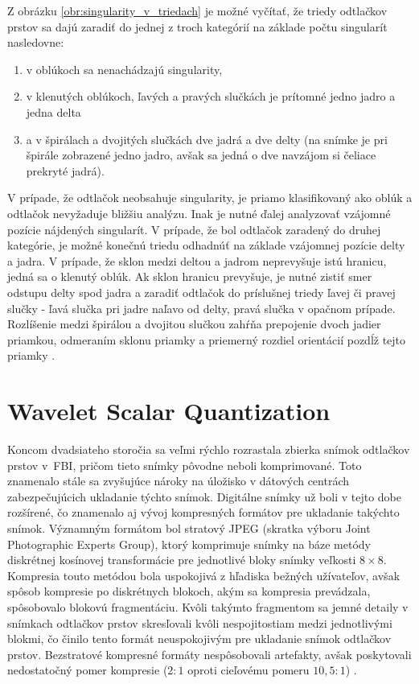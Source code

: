   Z obrázku \ref{obr:singularity_v_triedach} je možné vyčítať, že triedy odtlačkov prstov sa dajú zaradiť do jednej z troch kategórií na základe počtu
  singularít nasledovne:
  \begin{enumerate}
    \item v oblúkoch sa nenachádzajú singularity,
    \item v klenutých oblúkoch, ľavých a pravých slučkách je prítomné jedno jadro a jedna delta
    \item a v špirálach a dvojitých slučkách dve jadrá a dve delty (na snímke je pri špirále zobrazené jedno jadro, avšak sa jedná o dve navzájom si čeliace
    prekryté jadrá).
  \end{enumerate}
  V prípade, že odtlačok neobsahuje singularity, je priamo klasifikovaný ako oblúk a odtlačok nevyžaduje bližšiu analýzu. Inak je nutné ďalej analyzovať
  vzájomné pozície nájdených singularít. V prípade, že bol odtlačok zaradený do druhej kategórie, je možné konečnú triedu odhadnúť na základe vzájomnej pozície
  delty a jadra. V prípade, že sklon medzi deltou a jadrom neprevyšuje istú hranicu, jedná sa o klenutý oblúk. Ak sklon hranicu prevyšuje, je nutné zistiť smer
  odstupu delty spod jadra a zaradiť odtlačok do príslušnej triedy ľavej či pravej slučky - ľavá slučka pri jadre naľavo od delty, pravá slučka v opačnom
  prípade. Rozlíšenie medzi špirálou a dvojitou slučkou zahŕňa prepojenie dvoch jadier priamkou, odmeraním sklonu priamky a priemerný rozdiel orientácií
  pozdĺž tejto priamky \cite{Handbook}.

\chapter{Wavelet Scalar Quantization} \label{kap:wsq}
  Koncom dvadsiateho storočia sa veľmi rýchlo rozrastala zbierka snímok odtlačkov prstov v~FBI, pričom tieto snímky pôvodne neboli komprimované.
  Toto znamenalo stále sa zvyšujúce nároky na úložisko v dátových centrách zabezpečujúcich ukladanie týchto snímok. Digitálne snímky už boli v tejto dobe
  rozšírené, čo znamenalo aj vývoj kompresných formátov pre ukladanie takýchto snímok. Významným formátom bol stratový JPEG (skratka výboru Joint Photographic
  Experts Group), ktorý komprimuje snímky na báze metódy diskrétnej kosínovej transformácie pre jednotlivé bloky snímky veľkosti $8 \times{} 8$. Kompresia touto
  metódou bola uspokojivá z hľadiska bežných užívateľov, avšak spôsob kompresie po diskrétnych blokoch, akým sa kompresia prevádzala, spôsobovalo blokovú
  fragmentáciu. Kvôli takýmto fragmentom sa jemné detaily v snímkach odtlačkov prstov skresľovali kvôli nespojitostiam medzi jednotlivými blokmi,
  čo činilo tento formát neuspokojivým pre ukladanie snímok odtlačkov prstov. Bezstratové kompresné formáty nespôsobovali artefakty, avšak poskytovali
  nedostatočný pomer kompresie ($2:1$ oproti cieľovému pomeru $10,5:1$) \cite{Handbook}.
  
